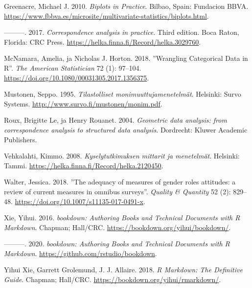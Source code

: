 \documentclass[
  finnish,
]{book}
\begin{document}
\leavevmode\hypertarget{ref-RefWorks:doc:5a857a43e4b0ed2d44664d7c}{}%
Greenacre, Michael J. 2010. \emph{Biplots in Practice}. Bilbao, Spain:
Fundacion BBVA.
\url{https://www.fbbva.es/microsite/multivariate-statistics/biplots.html}.

\leavevmode\hypertarget{ref-RefWorks:doc:5a857a43e4b0ed2d44664d78}{}%
---------. 2017. \emph{Correspondence analysis in practice}. Third
edition. Boca Raton, Florida: CRC Press.
\url{https://helka.finna.fi/Record/helka.3029760}.

\leavevmode\hypertarget{ref-RefWorks:doc:5c3759c2e4b0085b307c82b5}{}%
McNamara, Amelia, ja Nicholas J. Horton. 2018. ''Wrangling Categorical
Data in R''. \emph{The American Statistician} 72 (1): 97--104.
\url{https://doi.org/10.1080/00031305.2017.1356375}.

\leavevmode\hypertarget{ref-RefWorks:doc:5a857a44e4b0ed2d44664d95}{}%
Mustonen, Seppo. 1995. \emph{Tilastolliset monimuuttujamenetelmät}.
Helsinki: Survo Systems. \url{http://www.survo.fi/mustonen/monim.pdf}.

\leavevmode\hypertarget{ref-RefWorks:doc:5a857a43e4b0ed2d44664d75}{}%
Roux, Brigitte Le, ja Henry Rouanet. 2004. \emph{Geometric data
analysis: from correspondence analysis to structured data analysis}.
Dordrecht: Kluwer Academic Publishers.

\leavevmode\hypertarget{ref-RefWorks:doc:5a857a44e4b0ed2d44664da4}{}%
Vehkalahti, Kimmo. 2008. \emph{Kyselytutkimuksen mittarit ja
menetelmät}. Helsinki: Tammi.
\url{https://helka.finna.fi/Record/helka.2120450}.

\leavevmode\hypertarget{ref-RefWorks:doc:5bd08fb6e4b05c5447c9a9f9}{}%
Walter, Jessica. 2018. ''The adequacy of measures of gender roles
attitudes: a review of current measures in omnibus surveys''.
\emph{Quality \& Quantity} 52 (2): 829--48.
\url{https://doi.org/10.1007/s11135-017-0491-x}.

\leavevmode\hypertarget{ref-RefWorks:doc:5b6b36dde4b09b7ec442bf8b}{}%
Xie, Yihui. 2016. \emph{bookdown: Authoring Books and Technical
Documents with R Markdown}. Chapman; Hall/CRC.
\url{https://bookdown.org/yihui/bookdown/}.

\leavevmode\hypertarget{ref-R-bookdown}{}%
---------. 2020. \emph{bookdown: Authoring Books and Technical Documents
with R Markdown}. \url{https://github.com/rstudio/bookdown}.

\leavevmode\hypertarget{ref-RefWorks:doc:5b6b346fe4b0c619b11b8a3e}{}%
Yihui Xie, Garrett Grolemund, J. J. Allaire. 2018. \emph{R Markdown: The
Definitive Guide}. Chapman; Hall/CRC.
\url{https://bookdown.org/yihui/rmarkdown/}.

\backmatter
\end{document}
